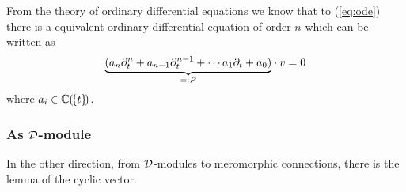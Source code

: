 From the theory of ordinary differential equations we know that to
(\ref{eq:ode}) there is a equivalent ordinary differential equation of order
$n$ which can be written as
\[
  \underset{=:P}{\underbrace{%
      (a_n\partial_t^n+a_{n-1}\partial_t^{n-1}+\cdots a_{1}\partial_t+a_{0})
  }} \cdot v=0
\]
where $a_i\in\mathbb{C}(\!\{t\}\!)$. \TODO{}

\begin{comment}
  See \cite[Sec.1.4]{babbitt1983} for \textbf{ode of rank $n$} to
  \textbf{system}.
\end{comment}

\subsubsection{As $\mathcal{D}$-module}
\begin{comment}
  \cite[Sec.4.2.2]{Loday2014}
\end{comment}

In the other direction, from $\mathcal{D}$-modules to meromorphic connections, there is
the lemma of the cyclic vector. \TODO{}
\begin{comment}
  \begin{itemize}
    \item \cite[Rem.4.2.6]{Loday2014}
  \end{itemize}
\end{comment}

